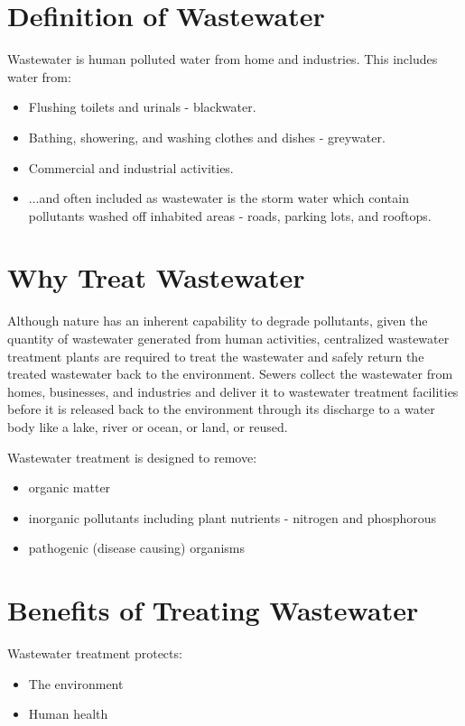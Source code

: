 \documentclass{article}
\begin{document}
\section{Definition of Wastewater}


Wastewater is human polluted water from home and industries. This includes water from:
\begin{itemize}
\item Flushing toilets and urinals  - blackwater.
\item Bathing, showering, and washing clothes and dishes  - greywater.
\item Commercial and industrial activities.
\item ...and often included as wastewater is the storm water which contain pollutants washed off inhabited areas - roads, parking lots, and rooftops.
\end{itemize}

\section{Why Treat Wastewater}
Although nature has an inherent capability to degrade pollutants, given the quantity of wastewater generated from human activities, centralized wastewater treatment plants are required to treat the wastewater and safely return the treated wastewater back to the environment.  Sewers collect the wastewater from homes, businesses, and industries and deliver it to wastewater treatment facilities before it is released back to the environment through its discharge to a water body like a lake, river or ocean, or land, or reused. 

Wastewater treatment is designed to remove:
\begin{itemize}
\item organic matter
\item inorganic  pollutants including plant nutrients - nitrogen and phosphorous\\
\item pathogenic (disease causing) organisms\\
\end{itemize}

\section{Benefits of Treating Wastewater}
Wastewater treatment protects:
\begin{itemize}
\item The environment
\item Human health
\end{itemize}
\end{document}
